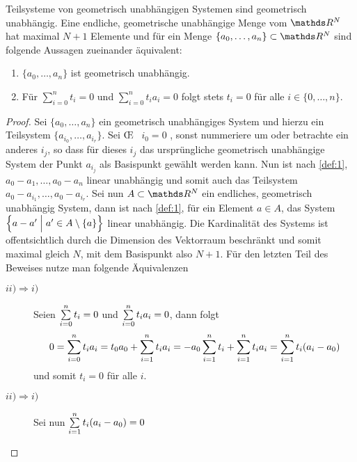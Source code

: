 \begin{Lem}\label{lem:1}
  Teilsysteme von geometrisch unabhängigen Systemen sind geometrisch
  unabhängig. Eine endliche, geometrische unabhängige Menge vom $\R^N$
  hat maximal $N+1$ Elemente und für ein Menge
  $\{ a_0 , \ldots , a_n \} \subset \R^N$ sind folgende Aussagen
  zueinander äquivalent:

  \begin{enumerate}[$(i)$]
  \item $\{ a_0 , \ldots , a_n \}$ ist geometrisch unabhängig.
  \item Für $\sum\limits_{i=0}^n t_i = 0$ und
    $\sum\limits_{i=0}^n t_i a_i = 0$ folgt stets $t_i = 0$ für alle
    $i \in \{ 0,\ldots,n\}$.
  \end{enumerate}

  \begin{proof}
    Sei $\{ a_0 , \ldots , a_n \}$ ein geometrisch unabhängiges System
    und hierzu ein Teilsystem $\{ a_{i_0},\ldots,a_{i_r} \}$.  Sei
    \OE~ $i_0 = 0$ , sonst nummeriere um oder betrachte ein anderes
    $i_j$, so dass für dieses $i_j$ das ursprüngliche geometrisch
    unabhängige System der Punkt $a_{i_j}$ als Basispunkt gewählt
    werden kann. Nun ist nach \cref{def:1},
    $ a_0 - a_1 , \ldots , a_0 - a_n$ linear unabhängig und somit auch
    das Teilsystem $ a_0 - a_ {i_1}, \ldots , a_0 - a_{i_r}$.  Sei nun
    $A \subset \R^N$ ein endliches, geometrisch unabhängig System,
    dann ist nach \cref{def:1}, für ein Element $a \in A$, das System
    $\set{ a - a'}{a' \in A \setminus \sset{a} }$ linear unabhängig.
    Die Kardinalität des Systems ist offentsichtlich durch die
    Dimension des Vektorraum beschränkt und somit maximal gleich $N$,
    mit dem Basispunkt also $N+1$. Für den letzten Teil des Beweises
    nutze man folgende Äquivalenzen
    \begin{description}
    \item[$ii)
      \Rightarrow i)$] Seien $\sp{0}{n} t_i = 0$ und $\sp{0}{n} t_i
      a_i = 0$, dann folgt 
      \begin{gather*}
        0 = \sp{0}{n} t_i a_i = t_0 a_0 + \sp{1}{n} t_i a_i = -a_0
        \sp{1}{n} t_i + \sp{1}{n} t_i a_i = \sp{1}{n} t_i (a_i - a_0)
    \end{gather*}
    und somit $t_i = 0$ für alle $i$.
      \item[$ii) \Rightarrow i)$]
        Sei nun $\sp{1}{n} t_i (a_i - a_0) = 0$ 
    \end{description}
  \end{proof}
\end{Lem}

